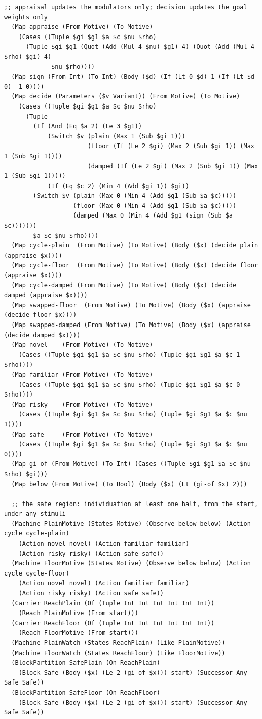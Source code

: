 \documentclass[11pt]{article}
\theoremstyle{definition}
\theoremstyle{plain}
\begin{document}
\begin{lstlisting}[style=mettafull]
  ;; appraisal updates the modulators only; decision updates the goal weights only
  (Map appraise (From Motive) (To Motive)
    (Cases ((Tuple $gi $g1 $a $c $nu $rho)
      (Tuple $gi $g1 (Quot (Add (Mul 4 $nu) $g1) 4) (Quot (Add (Mul 4 $rho) $gi) 4)
             $nu $rho))))
  (Map sign (From Int) (To Int) (Body ($d) (If (Lt 0 $d) 1 (If (Lt $d 0) -1 0))))
  (Map decide (Parameters ($v Variant)) (From Motive) (To Motive)
    (Cases ((Tuple $gi $g1 $a $c $nu $rho)
      (Tuple
        (If (And (Eq $a 2) (Le 3 $g1))
            (Switch $v (plain (Max 1 (Sub $gi 1)))
                       (floor (If (Le 2 $gi) (Max 2 (Sub $gi 1)) (Max 1 (Sub $gi 1))))
                       (damped (If (Le 2 $gi) (Max 2 (Sub $gi 1)) (Max 1 (Sub $gi 1)))))
            (If (Eq $c 2) (Min 4 (Add $gi 1)) $gi))
        (Switch $v (plain (Max 0 (Min 4 (Add $g1 (Sub $a $c)))))
                   (floor (Max 0 (Min 4 (Add $g1 (Sub $a $c)))))
                   (damped (Max 0 (Min 4 (Add $g1 (sign (Sub $a $c)))))))
        $a $c $nu $rho))))
  (Map cycle-plain  (From Motive) (To Motive) (Body ($x) (decide plain (appraise $x))))
  (Map cycle-floor  (From Motive) (To Motive) (Body ($x) (decide floor (appraise $x))))
  (Map cycle-damped (From Motive) (To Motive) (Body ($x) (decide damped (appraise $x))))
  (Map swapped-floor  (From Motive) (To Motive) (Body ($x) (appraise (decide floor $x))))
  (Map swapped-damped (From Motive) (To Motive) (Body ($x) (appraise (decide damped $x))))
  (Map novel    (From Motive) (To Motive)
    (Cases ((Tuple $gi $g1 $a $c $nu $rho) (Tuple $gi $g1 $a $c 1 $rho))))
  (Map familiar (From Motive) (To Motive)
    (Cases ((Tuple $gi $g1 $a $c $nu $rho) (Tuple $gi $g1 $a $c 0 $rho))))
  (Map risky    (From Motive) (To Motive)
    (Cases ((Tuple $gi $g1 $a $c $nu $rho) (Tuple $gi $g1 $a $c $nu 1))))
  (Map safe     (From Motive) (To Motive)
    (Cases ((Tuple $gi $g1 $a $c $nu $rho) (Tuple $gi $g1 $a $c $nu 0))))
  (Map gi-of (From Motive) (To Int) (Cases ((Tuple $gi $g1 $a $c $nu $rho) $gi)))
  (Map below (From Motive) (To Bool) (Body ($x) (Lt (gi-of $x) 2)))

  ;; the safe region: individuation at least one half, from the start, under any stimuli
  (Machine PlainMotive (States Motive) (Observe below below) (Action cycle cycle-plain)
    (Action novel novel) (Action familiar familiar)
    (Action risky risky) (Action safe safe))
  (Machine FloorMotive (States Motive) (Observe below below) (Action cycle cycle-floor)
    (Action novel novel) (Action familiar familiar)
    (Action risky risky) (Action safe safe))
  (Carrier ReachPlain (Of (Tuple Int Int Int Int Int Int))
    (Reach PlainMotive (From start)))
  (Carrier ReachFloor (Of (Tuple Int Int Int Int Int Int))
    (Reach FloorMotive (From start)))
  (Machine PlainWatch (States ReachPlain) (Like PlainMotive))
  (Machine FloorWatch (States ReachFloor) (Like FloorMotive))
  (BlockPartition SafePlain (On ReachPlain)
    (Block Safe (Body ($x) (Le 2 (gi-of $x))) start) (Successor Any Safe Safe))
  (BlockPartition SafeFloor (On ReachFloor)
    (Block Safe (Body ($x) (Le 2 (gi-of $x))) start) (Successor Any Safe Safe))


\end{lstlisting}
\end{document}
